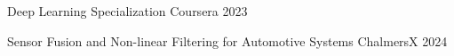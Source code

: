 

\begin{cvhonors}

  \cvhonor
    {Deep Learning Specialization} %
    {Coursera} %
    {} %
    {2023} %

  \cvhonor
    {Sensor Fusion and Non-linear Filtering for Automotive Systems} %
    {ChalmersX} %
    {} %
    {2024} %


\end{cvhonors}
